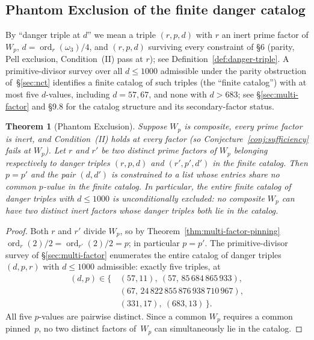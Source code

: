 \documentclass[12pt]{article}
\theoremstyle{plain}
\newtheorem{theorem}{Theorem}[section]
\theoremstyle{definition}
\theoremstyle{remark}
\begin{document}
\subsection{Phantom Exclusion of the finite danger catalog}

By ``danger triple at \(d\)'' we mean a triple \((r, p, d)\) with
\(r\) an inert prime factor of \(W_p\),
\(d = \operatorname{ord}_r(\omega_3)/4\), and
\((r, p, d)\) surviving every constraint of \S6 (parity, Pell
exclusion, Condition~(II) pass at \(r\)); see
Definition~\ref{def:danger-triple}. A primitive-divisor survey
over all \(d \leq 1000\) admissible under the parity obstruction
of~\S\ref{sec:nct} identifies a finite catalog of such triples
(the ``finite catalog'') with at most five \(d\)-values, including
\(d = 57, 67\), and none with \(d > 683\); see \S\ref{sec:multi-factor}
and \S9.8 for the catalog structure and its secondary-factor
status.

\begin{theorem}[Phantom Exclusion]\label{thm:phantom-exclusion}
Suppose \(W_p\) is composite, every prime factor is inert, and
Condition~(II) holds at every factor (so
Conjecture~\ref{conj:sufficiency} fails at \(W_p\)). Let \(r\)
and \(r'\) be two distinct prime factors of \(W_p\) belonging
respectively to danger triples \((r, p, d)\) and \((r', p', d')\)
in the finite catalog. Then \(p = p'\) and the pair
\((d, d')\) is constrained to a list whose entries share no common
\(p\)-value in the finite catalog.
In particular, the entire finite catalog of danger triples with
\(d \leq 1000\) is \emph{unconditionally} excluded: no composite
\(W_p\) can have two distinct inert factors whose danger triples
both lie in the catalog.
\end{theorem}

\begin{proof}
Both \(r\) and \(r'\) divide \(W_p\), so by
Theorem~\ref{thm:multi-factor-pinning}
\(\operatorname{ord}_r(2)/2 = \operatorname{ord}_{r'}(2)/2 = p\);
in particular \(p = p'\). The primitive-divisor survey of
\S\ref{sec:multi-factor} enumerates the entire catalog of danger
triples \((d, p, r)\) with \(d \leq 1000\) admissible: exactly five
triples, at
\begin{align*}
  (d, p) \in \{\,&(57, 11),\ (57,\, 85\,684\,865\,933),\\
               &(67,\, 24\,822\,855\,876\,938\,710\,967),\\
               &(331, 17),\ (683, 13)\,\}.
\end{align*}
All five \(p\)-values are pairwise distinct. Since a common
\(W_p\) requires a common pinned~\(p\), no two distinct factors
of~\(W_p\) can simultaneously lie in the catalog.
\end{proof}
\end{document}
